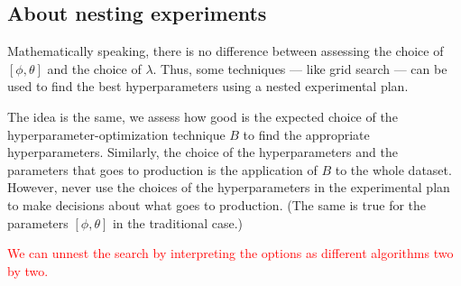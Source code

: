 \subsection{About nesting experiments}

Mathematically speaking, there is no difference between assessing the choice of
$\left[\phi, \theta\right]$ and the choice of $\lambda$.  Thus, some techniques --- like
grid search --- can be used to find the best hyperparameters using a nested experimental
plan.

The idea is the same, we assess how good is the expected choice of the
hyperparameter-optimization technique $B$ to find the appropriate hyperparameters.  Similarly,
the choice of the hyperparameters and the parameters that goes to production is the
application of $B$ to the whole dataset.  However, never use the choices of the
hyperparameters in the experimental plan to make decisions about what goes to production.
(The same is true for the parameters $\left[\phi, \theta\right]$ in the traditional case.)

\textcolor{red}{We can unnest the search by interpreting the options as different
algorithms two by two.}

